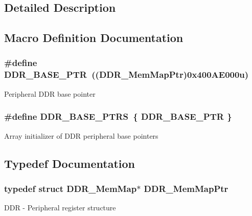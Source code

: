 \subsection{Detailed Description}


\subsection{Macro Definition Documentation}
\hypertarget{group___d_d_r___peripheral_ga6be9f9ecee4c870709dbf1d87708b205}{}
\subsubsection[{D\+D\+R\+\_\+\+B\+A\+S\+E\+\_\+\+P\+T\+R}]{\setlength{\rightskip}{0pt plus 5cm}\#define D\+D\+R\+\_\+\+B\+A\+S\+E\+\_\+\+P\+T\+R~(({\bf D\+D\+R\+\_\+\+Mem\+Map\+Ptr})0x400\+A\+E000u)}\label{group___d_d_r___peripheral_ga6be9f9ecee4c870709dbf1d87708b205}
Peripheral D\+D\+R base pointer \hypertarget{group___d_d_r___peripheral_gad0f00467c6ba2adc2a6b7b8d501f7405}{}
\subsubsection[{D\+D\+R\+\_\+\+B\+A\+S\+E\+\_\+\+P\+T\+R\+S}]{\setlength{\rightskip}{0pt plus 5cm}\#define D\+D\+R\+\_\+\+B\+A\+S\+E\+\_\+\+P\+T\+R\+S~\{ {\bf D\+D\+R\+\_\+\+B\+A\+S\+E\+\_\+\+P\+T\+R} \}}\label{group___d_d_r___peripheral_gad0f00467c6ba2adc2a6b7b8d501f7405}
Array initializer of D\+D\+R peripheral base pointers 

\subsection{Typedef Documentation}
\hypertarget{group___d_d_r___peripheral_gac9d35670854682dcae0e5ee573ce6144}{}
\subsubsection[{D\+D\+R\+\_\+\+Mem\+Map\+Ptr}]{\setlength{\rightskip}{0pt plus 5cm}typedef struct {\bf D\+D\+R\+\_\+\+Mem\+Map}$\ast$ {\bf D\+D\+R\+\_\+\+Mem\+Map\+Ptr}}\label{group___d_d_r___peripheral_gac9d35670854682dcae0e5ee573ce6144}
D\+D\+R -\/ Peripheral register structure 